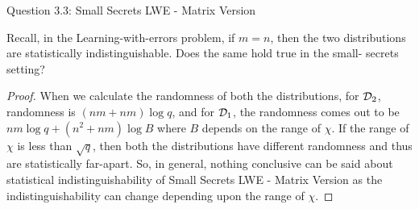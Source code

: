 \begin{solution}{Question 3.3: Small Secrets LWE - Matrix Version}\label{ques:33}
    \begin{question}
    Recall, in the Learning-with-errors problem, if $m = n$, then the two distributions are statistically indistinguishable. Does the same hold true in the small- secrets setting?
    \end{question}
    \tcblower{}
    \begin{proof}
    
        When we calculate the randomness of both the distributions, for $\mathcal{D}_2$, randomness is $(nm+nm)\log q$, and for $\mathcal{D}_1$, the randomness comes out to be $nm \log q + (n^2 +nm)\log B$ where $B$ depends on the range of $\chi$. If the range of $\chi$ is less than $\sqrt{q}$, then both the distributions have different randomness and thus are statistically far-apart. So, in general, nothing conclusive can be said about statistical indistinguishability of Small Secrets LWE - Matrix Version as the indistinguishability can change depending upon the range of $\chi$.
    \end{proof}
\end{solution}
